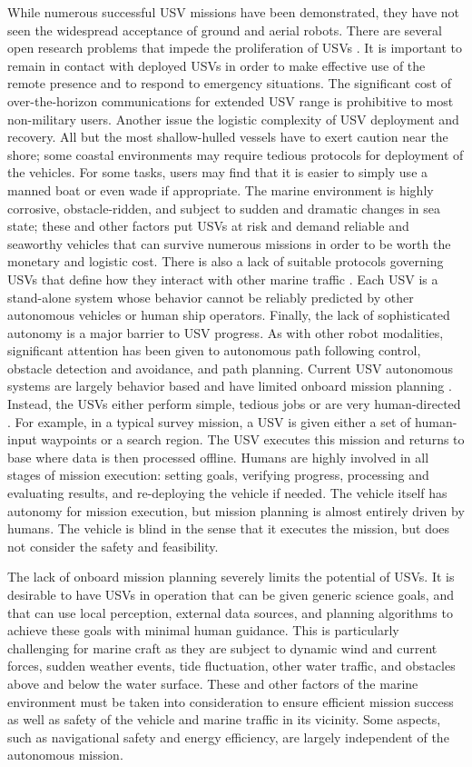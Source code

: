 \documentclass{tamuccthesis}
\begin{document}
While numerous successful USV missions have been demonstrated, they have not seen the widespread acceptance of ground and aerial robots. There are several open research problems that impede the proliferation of USVs \cite{bertram2008unmanned, liu:2016}. It is important to remain in contact with deployed USVs in order to make effective use of the remote presence and to respond to emergency situations. The significant cost of over-the-horizon communications for extended USV range is prohibitive to most non-military users. Another issue the logistic complexity of USV deployment and recovery. All but the most shallow-hulled vessels have to exert caution near the shore; some coastal environments may require tedious protocols for deployment of the vehicles. For some tasks, users may find that it is easier to simply use a manned boat or even wade if appropriate. The marine environment is highly corrosive, obstacle-ridden, and subject to sudden and dramatic changes in sea state; these and other factors put USVs at risk and demand reliable and seaworthy vehicles that can survive numerous missions in order to be worth the monetary and logistic cost. There is also a lack of suitable protocols governing USVs that define how they interact with other marine traffic \cite{manley2008unmanned}. Each USV is a stand-alone system whose behavior cannot be reliably predicted by other autonomous vehicles or human ship operators. Finally, the lack of sophisticated autonomy is a major barrier to USV progress. As with other robot modalities, significant attention has been given to autonomous path following control, obstacle detection and avoidance, and path planning. Current USV autonomous systems are largely behavior based and have limited onboard mission planning \cite{liu:2016}. Instead, the USVs either perform simple, tedious jobs or are very human-directed \cite{manley2008unmanned}. For example, in a typical survey mission, a USV is given either a set of human-input waypoints or a search region. The USV executes this mission and returns to base where data is then processed offline. Humans are highly involved in all stages of mission execution: setting goals, verifying progress, processing and evaluating results, and re-deploying the vehicle if needed. The vehicle itself has autonomy for mission execution, but mission planning is almost entirely driven by humans. The vehicle is blind in the sense that it executes the mission, but does not consider the safety and feasibility. 

The lack of onboard mission planning severely limits the potential of USVs. It is desirable to have USVs in operation that can be given generic science goals, and that can use local perception, external data sources, and planning algorithms to achieve these goals with minimal human guidance. This is particularly challenging for marine craft as they are subject to dynamic wind and current forces, sudden weather events, tide fluctuation, other water traffic, and obstacles above and below the water surface. These and other factors of the marine environment must be taken into consideration to ensure efficient mission success as well as safety of the vehicle and marine traffic in its vicinity. Some aspects, such as navigational safety and energy efficiency, are largely independent of the autonomous mission. 
\end{document}
